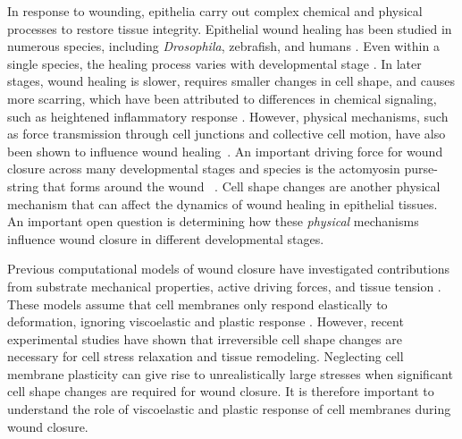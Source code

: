 \documentclass[%
 reprint,
superscriptaddress,
amsmath,amssymb,
prl,
floatfix,
]{revtex4-2}
\begin{document}
\maketitle
In response to wounding, epithelia carry out complex chemical and physical processes to restore tissue integrity. Epithelial wound healing has been studied in numerous species, including \textit{Drosophila}, zebrafish, and humans \cite{wood2002wound, abreu2012drosophila, tetley2019tissue, miskolci2019distinct, wong2012focal, guo2010factors, george2006basic}. Even within a single species, the healing process varies with developmental stage \cite{tetley2019tissue, redd2004wound}. In later stages, wound healing is slower, requires smaller changes in cell shape, and causes more scarring, which have been attributed to differences in chemical signaling, such as heightened inflammatory response \cite{redd2004wound, richardson2013adult, cordeiro2013role}. However, physical mechanisms, such as force transmission through cell junctions and collective cell motion, have also been shown to influence wound healing~\cite{li2013collective,brugues2014forces,ladoux2017mechanobiology}. An important driving force for wound closure across many developmental stages and species is the actomyosin purse-string that forms around the wound ~\cite{wood2002wound, redd2004wound, abreu2012drosophila, davidson2002embryonic, brugues2014forces}. Cell shape changes \cite{bi2015density,park2015unjamming,grosser2021cell} are another physical mechanism that can affect the dynamics of wound healing in epithelial tissues. An important open question is determining how these \textit{physical} mechanisms influence wound closure in different developmental stages. 

Previous computational models of wound closure have investigated contributions from substrate mechanical properties, active driving forces, and tissue tension \cite{bi2016motility,staddon2018cooperation,brugues2014forces, tetley2019tissue}. These models assume that cell membranes only respond elastically to deformation, ignoring viscoelastic and plastic response \cite{janshoff2021viscoelastic, shi2018cell, wyatt2016question}. However, recent experimental studies have shown that irreversible cell shape changes \cite{molnar2021plastic, staddon2019mechanosensitive, khalilgharibi2019stress, cavanaugh2020rhoa} are necessary for cell stress relaxation and tissue remodeling. Neglecting cell membrane plasticity can give rise to unrealistically large stresses when significant cell shape changes are required for wound closure.  It is therefore important to understand the role of viscoelastic and plastic response of cell membranes during wound closure. 
\end{document}
